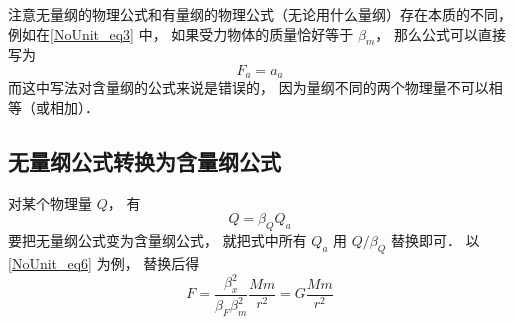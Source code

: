 注意无量纲的物理公式和有量纲的物理公式（无论用什么量纲）存在本质的不同， 例如在\autoref{NoUnit_eq3} 中， 如果受力物体的质量恰好等于 $\beta_m$， 那么公式可以直接写为
\begin{equation}\label{NoUnit_eq7}
F_a = a_a
\end{equation}
而这中写法对含量纲的公式来说是错误的， 因为量纲不同的两个物理量不可以相等（或相加）．

\subsection{无量纲公式转换为含量纲公式}
对某个物理量 $Q$， 有
\begin{equation}
Q = \beta_Q Q_a
\end{equation}
要把无量纲公式变为含量纲公式， 就把式中所有 $Q_a$ 用 $Q/\beta_Q$ 替换即可． 以\autoref{NoUnit_eq6} 为例， 替换后得
\begin{equation}
F = \frac{\beta_x^2}{\beta_F\beta_m^2} \frac{Mm}{r^2} = G\frac{Mm}{r^2}
\end{equation}
